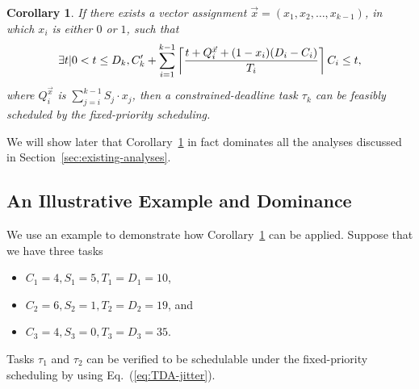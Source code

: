 \documentclass[10pt,conference,preprint]{IEEEtran}
\newcommand{\ceiling}[1]{\left\lceil{#1}\right\rceil}
\newtheorem{Corollary}{Corollary}
\begin{document}
 \begin{Corollary}
   \label{corollary:general-framework}
   If there exists a vector assignment $\vec{x} = (x_1, x_2, \ldots,
   x_{k-1})$, in which $x_i$ is either $0$ or $1$, such that 
   {\small \begin{equation} \label{eq:TDA-suspension-tighter} 
       \exists t | 0 < t \leq D_k, \\
       C_k'+ \sum_{i=1}^{k-1}\ceiling{\frac{t+Q_i^{\vec{x}}+(1-x_i)(D_i-C_i)}{T_i}} C_i \leq t,
     \end{equation}}where $Q_i^{\vec{x}}$ is $\sum_{j=i}^{k-1} S_j \cdot x_j$, then a constrained-deadline task $\tau_k$ can be feasibly scheduled by the fixed-priority scheduling.
 \end{Corollary}
 We will show later that Corollary~\ref{corollary:general-framework} in fact
 dominates all the analyses discussed in Section~\ref{sec:existing-analyses}.

\subsection{An Illustrative Example and Dominance}

We use an example to demonstrate how
Corollary~\ref{corollary:general-framework} can be applied. Suppose
that we have three tasks
\begin{itemize}
\item $C_1 = 4, S_1 = 5, T_1=D_1=10$, 
\item $C_2 = 6, S_2 = 1, T_2=D_2=19$,  and
\item $C_3 = 4, S_3 = 0, T_3=D_3=35$.
\end{itemize}
Tasks $\tau_1$ and $\tau_2$ can be verified to be schedulable under
the fixed-priority scheduling by using Eq.~(\ref{eq:TDA-jitter}). 
\end{document}
